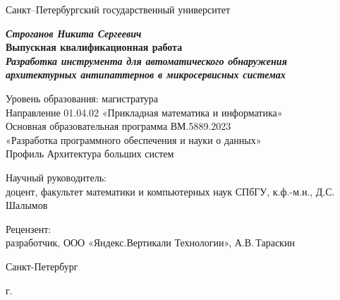 \begin{titlepage}
\begin{center}

Санкт--Петербургский государственный университет


\vspace{35mm}

\textbf{\textit{\large Строганов Никита Сергеевич}} \\[8mm]
\textbf{\large Выпускная квалификационная работа}\\[3mm]
\textbf{\textit{\large Разработка инструмента для автоматического обнаружения архитектурных антипаттернов в микросервисных системах}}

\vspace{20mm}
Уровень образования: магистратура\\
Направление 01.04.02 «Прикладная математика и информатика»\\
Основная образовательная программа ВМ.5889.2023\\
«Разработка программного обеспечения и науки о данных»\\
Профиль Архитектура больших систем\\[20mm]
\end{center}

\begin{flushright}
\begin{minipage}[t]{0.65\textwidth}
{Научный руководитель:} \\
доцент, факультет математики и компьютерных наук СПбГУ, к.ф.-м.н., Д.С.\,Шалымов
\vspace{10mm}


{Рецензент:} \\
разработчик, ООО «Яндекс.Вертикали Технологии», А.В.\,Тараскин
\end{minipage}
\end{flushright}

\vfill

\begin{center}
{Санкт-Петербург}
\par{\the\year{} г.}
\end{center}
\end{titlepage}
\restoregeometry
\addtocounter{page}{1}
